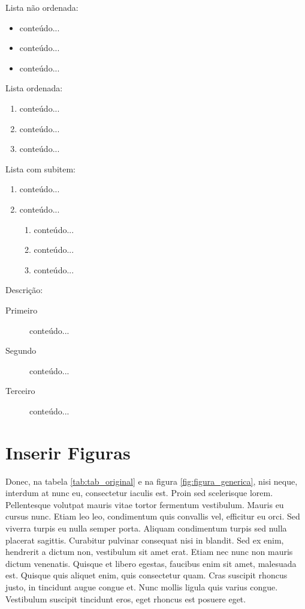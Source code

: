 \documentclass[12pt]{article}
\begin{document}
Lista não ordenada:

\begin{itemize}
	\item conteúdo...
	\item conteúdo...
	\item conteúdo...
\end{itemize}

Lista ordenada:
\begin{enumerate}
	\item conteúdo...
	\item conteúdo...
	\item conteúdo...
\end{enumerate}

Lista com subitem:
\begin{enumerate}
	\item conteúdo...
	\item conteúdo...
	\begin{enumerate}
		\item conteúdo...
		\item conteúdo...
		\item conteúdo...
	\end{enumerate}
\end{enumerate}

Descrição:
\begin{description}
	\item[Primeiro] conteúdo...
	\item[Segundo] conteúdo...
	\item[Terceiro] conteúdo...
\end{description}

\newpage
\section{Inserir Figuras}

Donec, na tabela \ref{tab:tab_original} e na figura \ref{fig:figura_generica}, nisi neque, interdum at nunc eu, consectetur iaculis est. Proin sed scelerisque lorem. Pellentesque volutpat mauris vitae tortor fermentum vestibulum. Mauris eu cursus nunc. Etiam leo leo, condimentum quis convallis vel, efficitur eu orci. Sed viverra turpis eu nulla semper porta. Aliquam condimentum turpis sed nulla placerat sagittis. Curabitur pulvinar consequat nisi in blandit. Sed ex enim, hendrerit a dictum non, vestibulum sit amet erat. Etiam nec nunc non mauris dictum venenatis. Quisque et libero egestas, faucibus enim sit amet, malesuada est. Quisque quis aliquet enim, quis consectetur quam. Cras suscipit rhoncus justo, in tincidunt augue congue et. Nunc mollis ligula quis varius congue. Vestibulum suscipit tincidunt eros, eget rhoncus est posuere eget.
\end{document}
